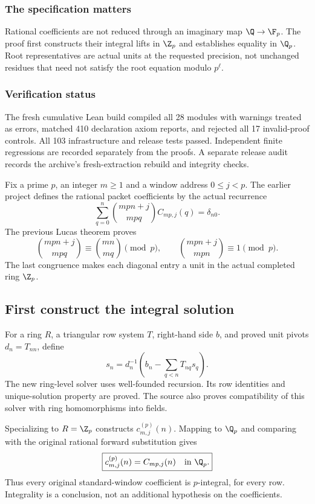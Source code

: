 \subsubsection*{The specification matters}
Rational coefficients are not reduced through an imaginary map $\Q\to\F_p$. The proof first constructs their integral lifts in $\Z_p$ and establishes equality in $\Q_p$. Root representatives are actual units at the requested precision, not unchanged residues that need not satisfy the root equation modulo $p^\ell$.

\subsubsection*{Verification status}
The fresh cumulative Lean build compiled all 28 modules with warnings treated as errors, matched 410 declaration axiom reports, and rejected all 17 invalid-proof controls. All 103 infrastructure and release tests passed. Independent finite regressions are recorded separately from the proofs. A separate release audit records the archive's fresh-extraction rebuild and integrity checks.
\par\medskip
{}
Fix a prime $p$, an integer $m\geq1$ and a window address $0\leq j<p$. The earlier project defines the rational packet coefficients by the actual recurrence
\[
 \sum_{q=0}^{n}\binom{mpn+j}{mpq}C_{mp,j}(q)=\delta_{n0}.
\]
The previous Lucas theorem proves
\[
 \binom{mpn+j}{mpq}\equiv\binom{mn}{mq}\pmod p,\qquad
 \binom{mpn+j}{mpn}\equiv1\pmod p.
\]
The last congruence makes each diagonal entry a unit in the actual completed ring $\Z_p$.

\subsection*{First construct the integral solution}
For a ring $R$, a triangular row system $T$, right-hand side $b$, and proved unit pivots $d_n=T_{nn}$, define
\[
 s_n=d_n^{-1}\left(b_n-\sum_{q<n}T_{nq}s_q\right).
\]
The new ring-level solver uses well-founded recursion. Its row identities and unique-solution property are proved. The source also proves compatibility of this solver with ring homomorphisms into fields.

Specializing to $R=\Z_p$ constructs $c^{(p)}_{m,j}(n)$. Mapping to $\Q_p$ and comparing with the original rational forward substitution gives
\[
 \boxed{c^{(p)}_{m,j}(n)=C_{mp,j}(n)\quad\text{in }\Q_p.}
\]
Thus every original standard-window coefficient is $p$-integral, for every row. Integrality is a conclusion, not an additional hypothesis on the coefficients.

